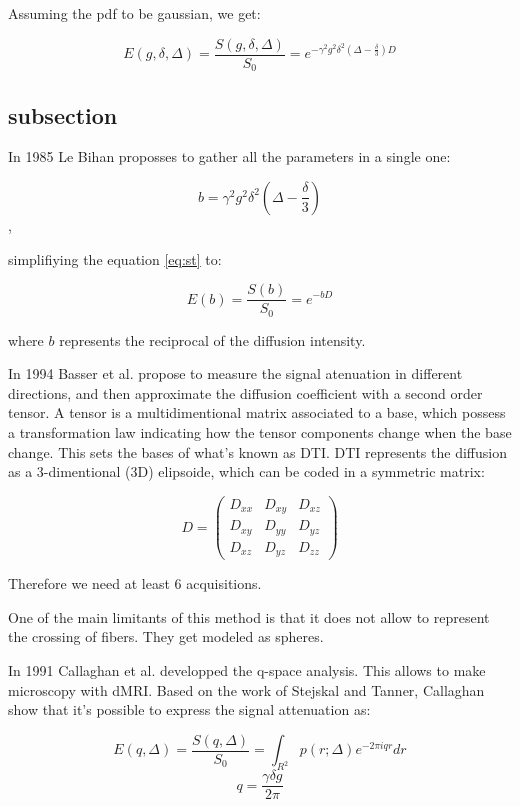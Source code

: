 Assuming the pdf to be gaussian, we get:

\begin{equation}
    E(g, \delta, \Delta) = 
    \frac{S(g, \delta, \Delta)}{S_0} =
         e^{-\gamma^2 g^2 \delta^2 \left(\Delta - \frac{\delta}{3}\right) D} 
    \label{eq:st}
\end{equation}

\subsection{subsection}
In 1985 Le Bihan \cite{LEBIHAN} proposses to gather all the parameters in a single one: 

$$ b = \gamma^2 g^2 \delta^2 \left(\Delta - \frac{\delta}{3}\right) $$ ,

simplifiying the equation \ref{eq:st} to:

$$ E(b) = \frac{S(b)}{S_0} = e^{-b D} $$

where $b$ represents the reciprocal of the diffusion intensity.

In 1994 Basser et al. \cite{Basser1994} propose to measure the signal atenuation in different directions, and then approximate the diffusion coefficient with a second order tensor.
A tensor is a multidimentional matrix associated to a base, which possess a transformation law indicating how the tensor components change when the base change.
This sets the bases of what's known as DTI.
DTI represents the diffusion as a 3-dimentional (3D) elipsoide, which can be coded in a symmetric matrix:

$$
    D =
    \begin{pmatrix}
             D_{xx} & D_{xy} & D_{xz} \\
             D_{xy} & D_{yy} & D_{yz} \\
             D_{xz} & D_{yz} & D_{zz}    
    \end{pmatrix}
$$

Therefore we need at least 6 acquisitions.

One of the main limitants of this method is that it does not allow to
represent the crossing of fibers. They get modeled as spheres.

In 1991 Callaghan et al. \cite{Callaghan1991} developped the q-space analysis.
This allows to make microscopy with dMRI.
Based on the work of Stejskal and Tanner, Callaghan show that it's possible to express the signal attenuation as:

$$E(q,\Delta) =  \frac{S(q,\Delta)}{S_0} = \int_{R^2}{p(r;\Delta)e^{-2\pi i q r} dr} $$
$$ q = \frac{\gamma \delta g}{2\pi} $$

